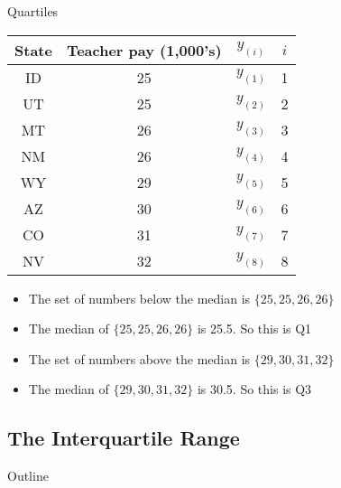\documentclass[xcolor=dvipsnames]{beamer}
\begin{document}
\begin{frame}{Quartiles}
	\begin{center}
		\begin{tabular}{|c|c|c|c|}
			\hline 
			\textbf{State} & \textbf{Teacher pay (1,000's)} & $y_{(i)}$ & $i$ \\ 
			\hline \hline 
			ID & 25 & $y_{(1)}$& 1 \\  \hline 
			UT &  25  & $y_{(2)}$& 2\\ \hline 
			MT &  26  & $y_{(3)}$& 3\\ \hline 
			NM &  26  & $y_{(4)}$& 4\\ \hline 
			WY &  29  & $y_{(5)}$& 5\\ \hline 
			AZ & 30  & $y_{(6)}$& 6\\ \hline 
			CO &  31 & $y_{(7)}$& 7\\ \hline
			NV & 32  & $y_{(8)}$& 8\\ \hline 
		\end{tabular} 
	\end{center} \pause
\begin{itemize}
	\item The set of numbers below the median is $\{25, 25, 26, 26\}$ \pause
	\item The median of $\{25, 25, 26, 26\}$ is 25.5. So this is Q1 \pause
	\item The set of numbers above the median is $\{29, 30, 31, 32\}$ \pause
	\item The median of $\{29, 30, 31, 32\}$ is 30.5. So this is Q3 \pause
\end{itemize}
\end{frame}

\subsection{The Interquartile Range}
\begin{frame}{Outline}
	\tableofcontents[currentsection,subsectionstyle=show/shaded/hide]
\end{frame}
\end{document}
